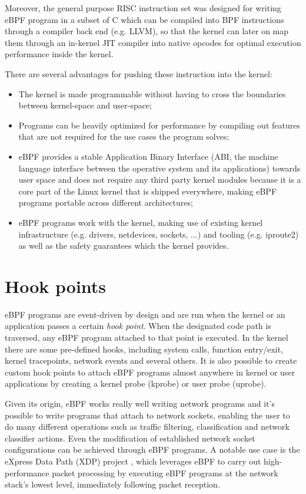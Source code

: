 Moreover, the general purpose RISC instruction set was designed for writing eBPF program in a subset of C which can be compiled into BPF instructions through a compiler back end (e.g. LLVM), so that the kernel can later on map them through an in-kernel JIT compiler into native opcodes for optimal execution performance inside the kernel.

There are several advantages for pushing these instruction into the kernel:

\begin{itemize}
	\item The kernel is made programmable without having to cross the boundaries
		between kernel-space and user-space;
	\item Programs can be heavily optimized for performance by compiling out features
		that are not required for the use cases the program solves;
	\item eBPF provides a stable Application Binary Interface (ABI, the machine
		language interface between the operative system and its applications) towards user space and does not require any third party kernel modules because it is a core part of the Linux kernel that is shipped everywhere, making eBPF programs portable across different architectures;
	\item eBPF programs work with the kernel, making use of existing kernel
		infrastructure (e.g. drivers, netdevices, sockets, ...) and tooling (e.g. iproute2) as well as the safety guarantees which the kernel provides.
\end{itemize}

\section{Hook points}

eBPF programs are event-driven by design and are run when the kernel or an application passes a certain \textit{hook point}. 
When the designated code path is traversed, any eBPF program attached to that point is executed.
In the kernel there are some pre-defined hooks, including system calls, function entry/exit, kernel tracepoints, network events and several others.
It is also possible to create custom hook points to attach eBPF programs almost anywhere in kernel or user applications by creating a kernel probe (kprobe) or user probe (uprobe).

Given its origin, eBPF works really well writing network programs and it's possible to write programs that attach to network sockets, enabling the user to do many different operations such as traffic filtering, classification and network classifier actions.
Even the modification of established network socket configurations can be achieved through eBPF programs.
A notable use case is the eXpress Data Path (XDP) project \cite{XDPWebsite}, which leverages eBPF to carry out high-performance packet processing by executing eBPF programs at the network stack's lowest level, immediately following packet reception.

